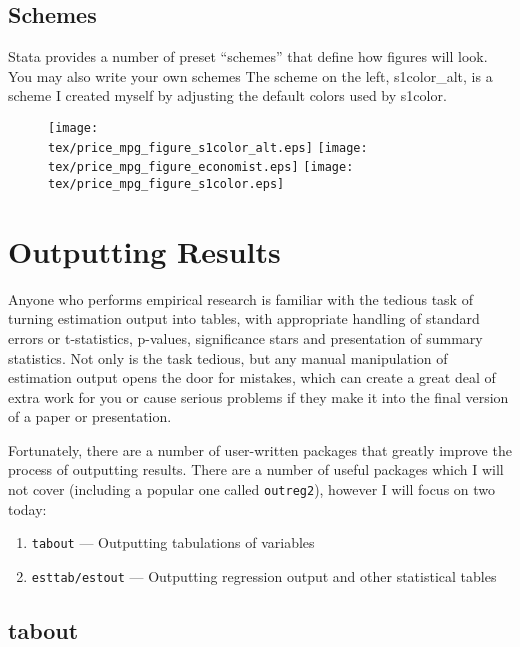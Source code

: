 \documentclass[fleqn, handout, 10pt]{beamer}
\def\tex{S:/trainings/stata/tex}
\def\lst{\lstinline}
\begin{document}
\subsection{Schemes}

\begin{frame}{Stata provides a number of preset ``schemes'' that define how figures will look. You may also write your own schemes}
    The scheme on the left, s1color\_alt, is a scheme I created myself by adjusting the default colors used by s1color.
    \begin{figure}
	\centering
	\texttt{[image: \\tex/price\_mpg\_figure\_s1color\_alt.eps]}
	\texttt{[image: \\tex/price\_mpg\_figure\_economist.eps]}
	\texttt{[image: \\tex/price\_mpg\_figure\_s1color.eps]}
    \end{figure}
\end{frame}


\section{Outputting Results}

\begin{frame}
    Anyone who performs empirical research is familiar with the tedious task of turning estimation output into tables, with appropriate handling of standard errors or t-statistics, p-values, significance stars and presentation of summary statistics. Not only is the task tedious, but any manual manipulation of estimation output opens the door for mistakes, which can create a great deal of extra work for you or cause serious problems if they make it into the final version of a paper or presentation.

    Fortunately, there are a number of user-written packages that greatly improve the process of outputting results. There are a number of useful packages which I will not cover (including a popular one called \lst=outreg2=), however I will focus on two today:
        \begin{enumerate}
    	\item \lst=tabout= --- Outputting tabulations of variables
    	\item \lst=esttab/estout= --- Outputting regression output and other statistical tables
        \end{enumerate}
\end{frame}

\subsection{tabout}
\end{document}
